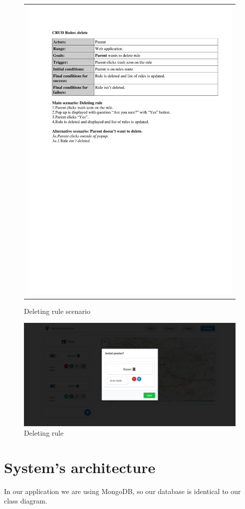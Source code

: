 \documentclass{sprawozdanie-agh}
\begin{document}
		\begin{figure}[H] 
			\centering
			\begin{tabular}{c}
				\includegraphics[width=.80\textwidth]{rulesDelete} 
			\end{tabular}  
		\caption{Deleting rule scenario}
		\end{figure}

		\begin{figure}[H]
			\centering
			\includegraphics[width=.80\textwidth]{deleteRule}
			\caption{Deleting rule}
		\end{figure}

	\section{System's architecture}
		In our application we are using MongoDB, so our database is identical to our class diagram.
		
\end{document}
